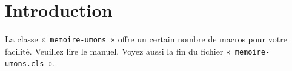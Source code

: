 \chapter{Introduction}

La classe «~\texttt{memoire-umons}~» offre un certain nombre de macros
pour votre facilité.  Veuillez lire le manuel.  Voyez aussi la fin du
fichier «~\texttt{memoire-\linebreak[2]umons.cls}~».



